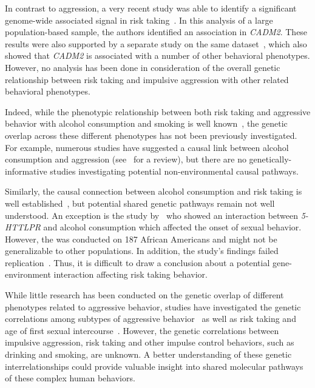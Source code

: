 In contrast to aggression, a very recent study was able to identify a significant genome-wide associated signal in risk taking~\cite{Day2016}. 
In this analysis of a large population-based sample, the authors identified an association in \textit{CADM2}.
These results were also supported by a separate study on the same dataset~\cite{Boutwell2017}, which also showed that \textit{CADM2} is associated with a number of other behavioral phenotypes.
However, no analysis has been done in consideration of the overall genetic relationship between risk taking and impulsive aggression with other related behavioral phenotypes.

Indeed, while the phenotypic relationship between both risk taking and aggressive behavior with alcohol consumption and smoking is well known~\cite{FRANZKOWIAX1987,Zuckerman2000,Dakwar2011},
the genetic overlap across these different phenotypes has not been previously investigated.
For example, numerous studies have suggested a causal link between alcohol consumption and aggression (see~\citet{Bushman1990} for a review), but there are no genetically-informative studies investigating potential non-environmental causal pathways.

Similarly, the causal connection between alcohol consumption and risk taking is well established~\cite{Lane2004}, but potential shared genetic pathways remain not well understood.
An exception is the study by~\cite{Kogan2010} who showed an interaction between \textit{5-HTTLPR} and alcohol consumption which affected the onset of sexual behavior. 
However, the was conducted on 187 African Americans and might not be generalizable to other populations. 
In addition, the study's findings failed replication~\cite{Rubens2016}.
Thus, it is difficult to draw a conclusion about a potential gene-environment interaction affecting risk taking behavior.

While little research has been conducted on the genetic overlap of different phenotypes related to aggressive behavior, studies have investigated the genetic correlations among subtypes of aggressive behavior~\cite{Tuvblad2011a} as well as risk taking and age of first sexual intercourse~\cite{Day2016}.
However, the genetic correlations between impulsive aggression, risk taking and other impulse control behaviors, such as drinking and smoking, are unknown.
A better understanding of these genetic interrelationships could provide valuable insight into shared molecular pathways of these complex human behaviors.

